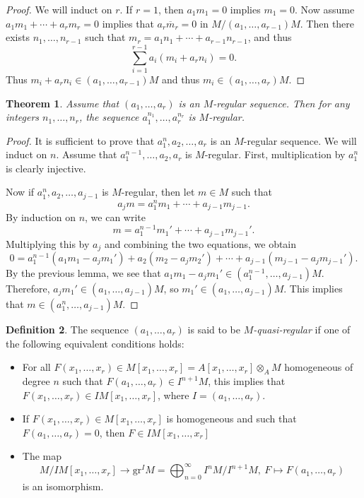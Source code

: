 \documentclass[leqno, openany]{memoir}
\newtheorem{thm}{Theorem}[section]
\theoremstyle{definition}
\newtheorem{defn}[thm]{Definition}
\theoremstyle{remark}
\theoremstyle{plain}
\theoremstyle{definition}
\theoremstyle{remark}
\newcommand{\mr}[1]{\mathrm{#1}}
\newcommand{\ol}[1]{\overline{#1}}
\begin{document}
\begin{proof} We will induct on $r$. If $r = 1$, then $a_1 m_1 = 0$ implies
    $m_1 = 0$. Now assume $a_1 m_1 + \cdots + a_r m_r = 0$ implies that $a_r
    \ol{m}_r = 0$ in $M / (a_1, \ldots, a_{r-1}) M$. Then there exists $n_1,
    \ldots, n_{r-1}$ such that $m_r = a_1 n_1 + \cdots + a_{r-1} n_{r-1}$, and
    thus \[ \sum_{i=1}^{r-1} a_i (m_i + a_r n_i) = 0. \] Thus $m_i + a_r n_i
\in (a_1, \ldots, a_{r-1})M$ and thus $m_i \in (a_1, \ldots, a_r)M$.
\end{proof}

\begin{thm} Assume that $(a_1, \ldots, a_r)$ is an $M$-regular sequence. Then
for any integers $n_1, \ldots, n_r$, the sequence $a_1^{n_1}, \ldots,
a_r^{n_r}$ is $M$-regular.  \end{thm}

\begin{proof} It is sufficient to prove that $a_1^n, a_2, \ldots, a_r$ is an
    $M$-regular sequence. We will induct on $n$. Assume that $a_1^{n-1},
    \ldots, a_2, a_r$ is $M$-regular. First, multiplication by $a_1^n$ is
    clearly injective. 

    Now if $a_1^n, a_2, \ldots, a_{j-1}$ is $M$-regular, then let $m \in M$
    such that \[ a_j m = a_1^n m_1 + \cdots + a_{j-1} m_{j-1}. \] By induction
    on $n$, we can write \[ m = a_1^{n-1} m_1' + \cdots + a_{j-1} m_{j-1}'. \]
    Multiplying this by $a_j$ and combining the two equations, we obtain \[ 0 =
    a_1^{n-1}(a_1 m_1 - a_jm_1') + a_2(m_2 - a_jm_2') + \cdots +
a_{j-1}(m_{j-1} - a_j m_{j-1}'). \] By the previous lemma, we see that $a_1 m_1
- a_j m_1' \in (a_1^{n-1}, \ldots, a_{j-1})M$. Therefore, $a_j m_1' \in (a_1,
\ldots, a_{j-1})M$, so $m_1' \in (a_1, \ldots, a_{j-1})M$. This implies that $m
\in (a_1^n, \ldots, a_{j-1})M$.  \end{proof}

\begin{defn} The sequence $(a_1, \ldots, a_r)$ is said to be
    \textit{$M$-quasi-regular} if one of the following equivalent conditions
    holds: \begin{itemize} \item For all $F(x_1, \ldots, x_r) \in M[x_1,
        \ldots, x_r] = A[x_1, \ldots, x_r] \otimes_A M$ homogeneous of degree
        $n$ such that $F(a_1, \ldots, a_r) \in I^{n+1}M$, this implies that
        $F(x_1, \ldots, x_r) \in IM[x_1, \ldots, x_r]$, where $I = (a_1,
        \ldots, a_r)$.  \item If $F(x_1, \ldots, x_r) \in M[x_1, \ldots, x_r]$
        is homogeneous and such that $F(a_1, \ldots, a_r) = 0$, then $F \in
        IM[x_1, \ldots, x_r]$ \item The map \[ M/IM[x_1, \ldots, x_r] \to
        \mr{gr}^I M = \bigoplus_{n=0}^{\infty} I^n M / I^{n+1}M,\ F \mapsto
    F(a_1, \ldots, a_r) \] is an isomorphism.  \end{itemize} \end{defn}
\end{document}
